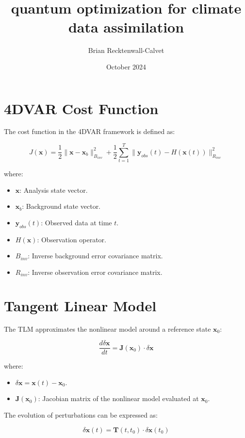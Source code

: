 \documentclass{article}
\title{quantum optimization for climate data assimilation}
\author{Brian Recktenwall-Calvet}
\date{October 2024}
\begin{document}
\maketitle

\section{4DVAR Cost Function}

The cost function in the 4DVAR framework is defined as:

\[
J(\mathbf{x}) = \frac{1}{2} \|\mathbf{x} - \mathbf{x}_b\|_{B_{inv}}^2 + \frac{1}{2} \sum_{t=1}^{T} \|\mathbf{y}_{obs}(t) - H(\mathbf{x}(t))\|_{R_{inv}}^2
\]

where:
\begin{itemize}
    \item \( \mathbf{x} \): Analysis state vector.
    \item \( \mathbf{x}_b \): Background state vector.
    \item \( \mathbf{y}_{obs}(t) \): Observed data at time \( t \).
    \item \( H(\mathbf{x}) \): Observation operator.
    \item \( B_{inv} \): Inverse background error covariance matrix.
    \item \( R_{inv} \): Inverse observation error covariance matrix.
\end{itemize}

\section{Tangent Linear Model}

The TLM approximates the nonlinear model around a reference state \( \mathbf{x}_0 \):

\[
\frac{d \delta \mathbf{x}}{dt} = \mathbf{J}(\mathbf{x}_0) \cdot \delta \mathbf{x}
\]

where:
\begin{itemize}
    \item \( \delta \mathbf{x} = \mathbf{x}(t) - \mathbf{x}_0 \).
    \item \( \mathbf{J}(\mathbf{x}_0) \): Jacobian matrix of the nonlinear model evaluated at \( \mathbf{x}_0 \).
\end{itemize}

The evolution of perturbations can be expressed as:

\[
\delta \mathbf{x}(t) = \mathbf{T}(t, t_0) \cdot \delta \mathbf{x}(t_0)
\]
\end{document}
